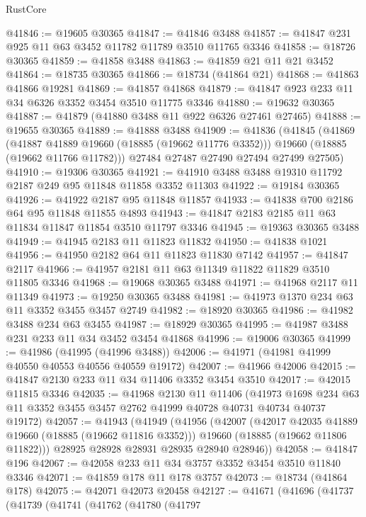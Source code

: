 \begin{lexlean}{RustCore}
\begin{coremodule}
@41846 := @19605 @30365
@41847 := @41846 @3488
@41857 := @41847 @231 @925 @11 @63 @3452 @11782 @11789 @3510 @11765 @3346
@41858 := @18726 @30365
@41859 := @41858 @3488
@41863 := @41859 @21 @11 @21 @3452
@41864 := @18735 @30365
@41866 := @18734 (@41864 @21)
@41868 := @41863 @41866 @19281
@41869 := @41857 @41868
@41879 := @41847 @923 @233 @11 @34 @6326 @3352 @3454 @3510 @11775 @3346
@41880 := @19632 @30365
@41887 := @41879 (@41880 @3488 @11 @922 @6326 @27461 @27465)
@41888 := @19655 @30365
@41889 := @41888 @3488
@41909 := @41836
    (@41845
      (@41869
        (@41887 @41889 @19660 (@18885 (@19662 @11776 @3352)))
        @19660
        (@18885 (@19662 @11766 @11782)))
      @27484
      @27487
      @27490
      @27494
      @27499
      @27505)
@41910 := @19306 @30365
@41921 := @41910 @3488 @3488 @19310 @11792 @2187 @249 @95 @11848 @11858 @3352 @11303
@41922 := @19184 @30365
@41926 := @41922 @2187 @95 @11848 @11857
@41933 := @41838 @700 @2186 @64 @95 @11848 @11855 @4893
@41943 := @41847 @2183 @2185 @11 @63 @11834 @11847 @11854 @3510 @11797 @3346
@41945 := @19363 @30365 @3488
@41949 := @41945 @2183 @11 @11823 @11832
@41950 := @41838 @1021
@41956 := @41950 @2182 @64 @11 @11823 @11830 @7142
@41957 := @41847 @2117
@41966 := @41957 @2181 @11 @63 @11349 @11822 @11829 @3510 @11805 @3346
@41968 := @19068 @30365 @3488
@41971 := @41968 @2117 @11 @11349
@41973 := @19250 @30365 @3488
@41981 := @41973 @1370 @234 @63 @11 @3352 @3455 @3457 @2749
@41982 := @18920 @30365
@41986 := @41982 @3488 @234 @63 @3455
@41987 := @18929 @30365
@41995 := @41987 @3488 @231 @233 @11 @34 @3452 @3454 @41868
@41996 := @19006 @30365
@41999 := @41986 (@41995 (@41996 @3488))
@42006 := @41971 (@41981 @41999 @40550 @40553 @40556 @40559 @19172)
@42007 := @41966 @42006
@42015 := @41847 @2130 @233 @11 @34 @11406 @3352 @3454 @3510
@42017 := @42015 @11815 @3346
@42035 := @41968
    @2130
    @11
    @11406
    (@41973 @1698 @234 @63 @11 @3352 @3455 @3457 @2762 @41999 @40728 @40731 @40734 @40737 @19172)
@42057 := @41943
    (@41949
      (@41956
        (@42007
          (@42017 @42035 @41889 @19660 (@18885 (@19662 @11816 @3352)))
          @19660
          (@18885 (@19662 @11806 @11822)))
        @28925
        @28928
        @28931
        @28935
        @28940
        @28946))
@42058 := @41847 @196
@42067 := @42058 @233 @11 @34 @3757 @3352 @3454 @3510 @11840 @3346
@42071 := @41859 @178 @11 @178 @3757
@42073 := @18734 (@41864 @178)
@42075 := @42071 @42073 @20458
@42127 := @41671
    (@41696
      (@41737
        (@41739
          (@41741
            (@41762
              (@41780
                (@41797

\end{coremodule}
\end{lexlean}
